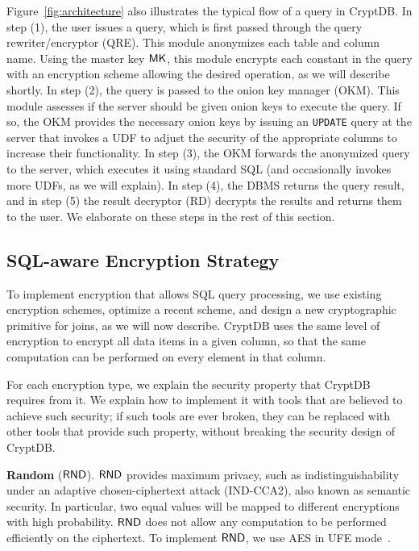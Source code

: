 Figure~\ref{fig:architecture} also illustrates the typical flow of a query
in CryptDB\@.
In step (1), the user issues a query, which is first passed through the query
rewriter/encryptor (QRE)\@. This module anonymizes each table and column name.
Using the master key $\mathsf{MK}$, this module encrypts each constant in the query with
an encryption scheme allowing the desired operation, as we will describe shortly.
In step (2), the query is passed to the onion key manager (OKM)\@. This module
assesses if the server should be given onion keys to execute the
query. If so, the OKM provides the necessary onion keys by issuing an
\texttt{UPDATE} query at the server that invokes a UDF to adjust the security
of the appropriate columns to increase their functionality. In step (3), the OKM
forwards the anonymized query to the server, which executes it using standard SQL
(and occasionally invokes more UDFs, as we will explain). In step (4), the DBMS
returns the query result, and in step (5) the result decryptor (RD) decrypts the
results and returns them to the user. We elaborate on these steps in the rest
of this section.





\subsection{SQL-aware Encryption Strategy}

To implement encryption that allows SQL query processing, we use existing
encryption schemes, optimize a recent scheme, and design a new
cryptographic primitive for joins, as we will now describe.
CryptDB uses the same level of encryption to encrypt all data items in
a given column, so that the same computation can be performed on every
element in that column.

For each encryption type, we explain the security property that CryptDB requires
from it. We explain how to implement it with tools that are believed to achieve such
security; if such tools are ever broken, they can be replaced with other tools
that provide such property, without breaking the security design of CryptDB\@.
 
\textbf{Random} ($\mathsf{RND}$)\@. $\mathsf{RND}$ provides maximum privacy, such as
indistinguishability under an adaptive chosen-ciphertext attack (IND-CCA2),
also known as semantic security.
In particular, two equal values will be mapped to different encryptions with
high probability. $\mathsf{RND}$ does not allow any computation to be performed efficiently on the
ciphertext.  To implement $\mathsf{RND}$, we use AES in UFE mode~\cite{desai:ufe}.

